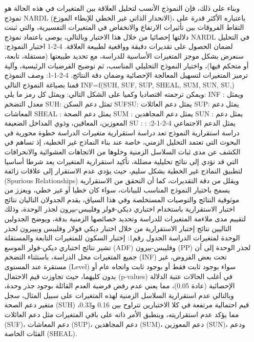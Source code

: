 \documentclass[12pt,a4paper]{report}
\begin{document}
وبناء على ذلك، فإن النموذج الأنسب لتحليل العلاقة بين المتغيرات في هذه الحالة هو نموذج NARDL (الانحدار الذاتي غير الخطي للإبطاء الموزع)، باعتباره الأكثر قدرة على التقاط الفروقات بين تأثيرات الارتفاع والانخفاض في المتغيرات التفسيرية، والتي ثبتت دلالتها إحصائيا من خلال هذا الاختبار وبالتالي، يوصى باعتماد نموذج NARDL في التحليل لضمان الحصول على تقديرات دقيقة وواقعية لطبيعة العلاقة.
4-2-1 اختبار النموذج:
سنعرض بشكل موجز المتغيرات الأساسية للدراسة، مع تحديد طبيعتها (مستقلة، تابعة، أو متحكم فيها)، واختيار النموذج التحليلي المناسب، ثم توضيح الفرضيات الرئيسية، وآلية ترميز المتغيرات لتسهيل المعالجة الإحصائية وضمان دقة النتائج.
4-2-1-1: وصف النموذج
قمنا بصياغة النموذج التالي INF=f(SUH, SUF, SUP, SHEAL, SUM, SUN, SU,) ويمكن ترجمته اقتصاديا وكميا على الشكل التالي:
ويمثل كل رمز ما يلي: 
INF : ويمثل معدل التضخم 
SUH:   تمثل دعم السكن
SUFSU: يمثل دعم العائلات
SUP:   يمثل دعم المعاشات
SHEAL :  يمثل دعم الصحة
SUM :  يمثل دعم المجاهدين
SUN :  يمثل دعم المعوزين، المعاقين، وذوي المداخل الضعيفة
SU : يمثل الدعم الاجتماعي
4-2-1-2: : دراسة استقرارية النموذج
	تعد دراسة استقرارية متغيرات الدراسة خطوة محورية في البحوث التي تعتمد التحليل الزمني، خاصة عند بناء النماذج غير الخطية، إذ تساهم في الكشف عن مدى ثبات السلاسل الزمنية وخلوها من الاتجاهات العشوائية والانحرافات التي قد تؤدي إلى نتائج تحليلية مضللة، تأكيد استقرارية المتغيرات يعد شرطا أساسيا لتطبيق النماذج غير الخطية بشكل سليم، حيث يؤدي عدم الاستقرار إلى علاقات زائفة (Spurious Relationships) ويقلل من دقة التقديرات، كما أن التحقق من الاستقرارية يسمح باختيار النموذج المناسب للبيانات، سواء كان خطيا أو غير خطي، ويعزز من موثوقية النتائج والتوصيات المستخلصة وفي هذا السياق، يقدم الجدولان التاليان نتائج اختبار الاستقرارية باستخدام اختباري ديكي-فولر وفليبس-بيرون لجذر الوحدة، وذلك لتقييم مدى ملاءمة المتغيرات للدراسة وتحديد خصائصها الزمنية بدقة، ويوضح الجدولين التاليين نتائج إختبار الاستقرارية من خلال اختبار ديكي فولار وفليبس وبييرون لجذر الوحدة لمتغيرات الدراسة
الجدول رقم1: إختبار السكون للمتغيرات التابعة والمستقلة
تشير نتائج اختباري ديكي-فولر الموسع (ADF) وفليبس-بيرون (PP) لجذر الوحدة إلى أن جميع المتغيرات محل الدراسة، باستثناء التضخم (INF) تحت بعض الفروض، غير مستقرة عند المستوى (Level) سواء بوجود ثابت فقط أو بوجود ثابت واتجاه عام أو بدون كليهما، حيث تجاوزت قيم الاحتمال (p-values) في أغلب الحالات عتبة الدلالة الإحصائية (عادة 0.05)، مما يعني عدم رفض فرضية العدم القائلة بوجود جذر وحدة، وبالتالي عدم استقرارية السلاسل الزمنية لهذه المتغيرات على سبيل المثال، سجل متغير دعم الصحة (SUH) قيم احتمالية مرتفعة في كلا الاختبارين تتراوح بين 0.16 و0.33، مما يؤكد عدم استقراريته، وينطبق الأمر ذاته على باقي المتغيرات مثل دعم العائلات (SUF)، دعم المعاشات (SUP)، دعم المجاهدين (SUM)، دعم المعوزين (SUN)، ودعم الفئات الخاصة (SHEAL).
\end{document}
